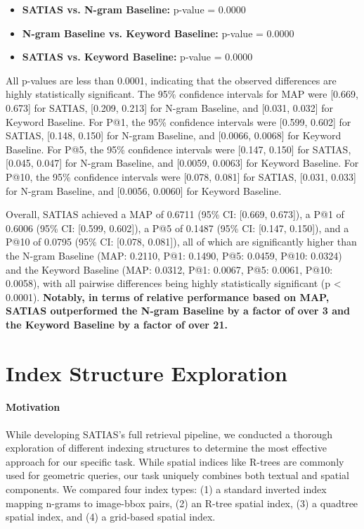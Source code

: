 \documentclass[sigconf,screen]{acmart}
\begin{document}
\begin{itemize}
    \item \textbf{SATIAS vs. N-gram Baseline:} p-value = 0.0000
    \item \textbf{N-gram Baseline vs. Keyword Baseline:} p-value = 0.0000
    \item \textbf{SATIAS vs. Keyword Baseline:} p-value = 0.0000
\end{itemize}

All p-values are less than 0.0001, indicating that the observed differences are highly statistically significant. The 95\% confidence intervals for MAP were [0.669, 0.673] for SATIAS, [0.209, 0.213] for N-gram Baseline, and [0.031, 0.032] for Keyword Baseline. For P@1, the 95\% confidence intervals were [0.599, 0.602] for SATIAS, [0.148, 0.150] for N-gram Baseline, and [0.0066, 0.0068] for Keyword Baseline. For P@5, the 95\% confidence intervals were [0.147, 0.150] for SATIAS, [0.045, 0.047] for N-gram Baseline, and [0.0059, 0.0063] for Keyword Baseline. For P@10, the 95\% confidence intervals were [0.078, 0.081] for SATIAS, [0.031, 0.033] for N-gram Baseline, and [0.0056, 0.0060] for Keyword Baseline.

Overall, SATIAS achieved a MAP of 0.6711 (95\% CI: [0.669, 0.673]), a P@1 of 0.6006 (95\% CI: [0.599, 0.602]), a P@5 of 0.1487 (95\% CI: [0.147, 0.150]), and a P@10 of 0.0795 (95\% CI: [0.078, 0.081]), all of which are significantly higher than the N-gram Baseline (MAP: 0.2110, P@1: 0.1490, P@5: 0.0459, P@10: 0.0324) and the Keyword Baseline (MAP: 0.0312, P@1: 0.0067, P@5: 0.0061, P@10: 0.0058), with all pairwise differences being highly statistically significant (p < 0.0001).
\textbf{Notably, in terms of relative performance based on MAP, SATIAS outperformed the N-gram Baseline by a factor of over 3 and the Keyword Baseline by a factor of over 21.}

\section{Index Structure Exploration}
\label{sec:index_exploration}

\paragraph{Motivation} While developing SATIAS's full retrieval pipeline, we conducted a thorough exploration of different indexing structures to determine the most effective approach for our specific task. While spatial indices like R-trees are commonly used for geometric queries, our task uniquely combines both textual and spatial components. We compared four index types: (1) a standard inverted index mapping n-grams to image-bbox pairs, (2) an R-tree spatial index, (3) a quadtree spatial index, and (4) a grid-based spatial index.
\end{document}

